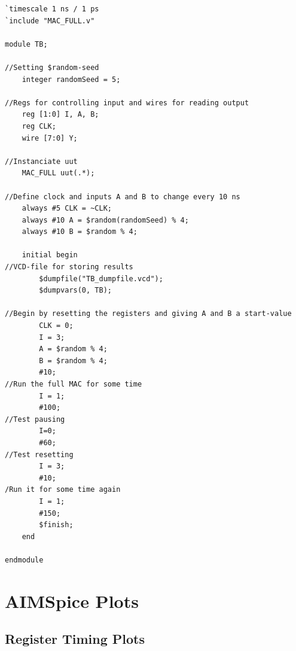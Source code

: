 \begin{lstlisting}[style=verilogStyle, caption=Full MAC Testbench in Verilog, label=verilog_FULLMAC_TB]
`timescale 1 ns / 1 ps
`include "MAC_FULL.v"

module TB;

//Setting $random-seed
    integer randomSeed = 5;

//Regs for controlling input and wires for reading output
    reg [1:0] I, A, B;
    reg CLK;
    wire [7:0] Y;

//Instanciate uut
    MAC_FULL uut(.*);

//Define clock and inputs A and B to change every 10 ns
    always #5 CLK = ~CLK;
    always #10 A = $random(randomSeed) % 4;
    always #10 B = $random % 4;

    initial begin
//VCD-file for storing results
        $dumpfile("TB_dumpfile.vcd");
        $dumpvars(0, TB);

//Begin by resetting the registers and giving A and B a start-value
        CLK = 0;
        I = 3;
        A = $random % 4;
        B = $random % 4;
        #10;
//Run the full MAC for some time
        I = 1;
        #100;
//Test pausing
        I=0;
        #60;
//Test resetting
        I = 3;
        #10;
/Run it for some time again
        I = 1;
        #150;
        $finish;
    end

endmodule
\end{lstlisting}

\newpage
\section{AIMSpice Plots}
\label{appendix:aimspicePlots}

\subsection{Register Timing Plots}
\label{appendix:register_plots}

